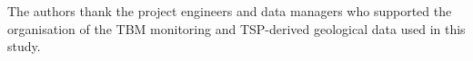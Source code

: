 The authors thank the project engineers and data managers who supported the
organisation of the TBM monitoring and TSP-derived geological data used in this
study.
